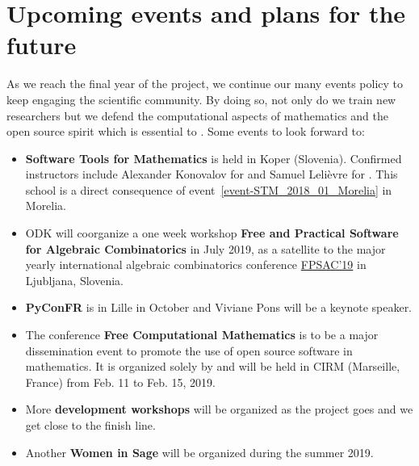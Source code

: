 \documentclass{deliverablereport}
\begin{document}






\section{Upcoming events and plans for the future}

As we reach the final year of the project, we continue our many events
policy to keep engaging the scientific community. By doing so,
not only do we train new researchers but we defend the computational aspects
of mathematics and the open source spirit which is essential to \ODK. 
Some events to look forward to:
\begin{itemize}
\item \textbf{Software Tools for Mathematics} is held in Koper (Slovenia). Confirmed
instructors include Alexander Konovalov for \GAP and Samuel Lelièvre for \Sage. This 
school is a direct consequence of event~\ref{event-STM_2018_01_Morelia} in Morelia.
\item ODK will coorganize a one week workshop \textbf{Free and
    Practical Software for Algebraic Combinatorics} in July 2019, as a
  satellite to the major yearly international algebraic combinatorics
  conference \href{http://fpsac2019.fmf.uni-lj.si/}{FPSAC'19} in
  Ljubljana, Slovenia.
\item \textbf{PyConFR} is in Lille in October and Viviane Pons will be a keynote speaker.
\item The conference \textbf{Free Computational Mathematics} is to be a major dissemination
event to promote the use of open source software in mathematics. It is organized solely by \ODK
and will be held in CIRM (Marseille, France) from Feb. 11 to Feb. 15, 2019.
\item More \textbf{development workshops} will be organized as the project goes and we get close
to the finish line.
\item Another \textbf{Women in Sage} will be organized during the summer 2019.
\end{itemize}


\end{document}
